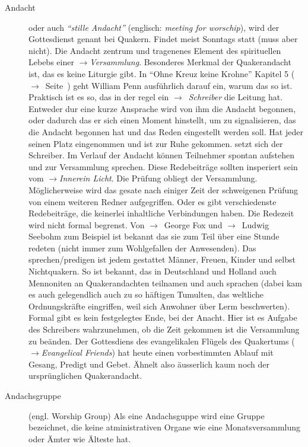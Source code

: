 \begin{description}
 \item[Andacht] oder auch \textit{"`stille Andacht"'} (englisch: \textit{meeting
for worschip}), wird der Gottesdienst genant bei Quakern. Findet meist Sonntags
statt (muss aber nicht). Die Andacht zentrum und tragenenes Element des
spirituellen Lebebs einer $\to$\textit{Versammlung}. Besonderes Merkmal der
Quakerandacht ist, das es keine Liturgie gibt. In "`Ohne Kreuz keine Krohne"'
Kapitel 5 ($\to$~Seite~\pageref{kap5_ab1}) geht William Penn ausführlich darauf
ein, warum das so ist. Praktisch ist es so, das in der regel ein
$\to$~\textit{Schreiber} die Leitung hat. Entweder dur eine kurze Ansprache wird
von ihm die Andacht begonnen, oder dadurch das er sich einen Moment hinstellt,
um zu signalisieren, das die Andacht begonnen hat und das Reden eingestellt
werden soll. Hat jeder seinen Platz eingenommen und ist zur Ruhe gekommen. setzt
sich der Schreiber. Im Verlauf der Andacht können Teilnehmer spontan aufstehen
und zur Versammlung sprechen. Diese Redebeiträge sollten insperiert sein vom
$\to$\textit{Innerein Licht}. Die Prüfung obliegt der Versammlung.
Möglicherweise wird das gesate nach einiger Zeit der schweigenen Prüfung von
einem weiteren Redner aufgegriffen. Oder es gibt verschiedenste Redebeiträge,
die keinerlei inhaltliche Verbindungen haben. Die Redezeit wird nicht formal
begrenst. Von $\to$~George Fox und $\to$~Ludwig Seebohm zum Beispiel ist bekannt
das sie zum Teil über eine Stunde redeten (nicht immer zum Wohlgefallen der
Anwesenden). Das sprechen/predigen ist jedem gestattet Männer, Freuen, Kinder
und selbst Nichtquakern. So ist bekannt, das in Deutschland und Holland auch
Mennoniten an Quakerandachten teilnamen und auch sprachen (dabei kam es auch
gelegendlich auch zu so häftigen Tumulten, das weltliche Ordnungskräfte
eingriffen, weil sich Anwohner über Lerm beschwerten). Formal gibt es kein
festgelegtes Ende, bei der Anacht. Hier ist es Aufgabe des Schreibers
wahrzunehmen, ob die Zeit gekommen ist die Versammlung zu beänden.  Der
Gottesdiens des evangelikalen Flügels des Quakertums ($\to$\textit{Evangelical
Friends}) hat heute einen vorbestimmten Ablauf mit Gesang, Predigt und Gebet.
Ähnelt also äusserlich kaum noch der ursprünglichen Quakerandacht.

 \item[Andachsgruppe] (engl. Worship Group) Als eine Andachsguppe wird eine
 Gruppe bezeichnet, die keine atministrativen Organe wie eine Monatsversammlung
 oder Ämter wie Älteste hat.


\end{description}
